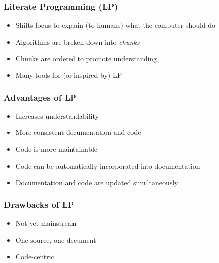 \documentclass{beamer}
\begin{document}

%
%


\begin{frame}
\frametitle{Literate Programming (LP)}

\begin{itemize}
\item Shifts focus to explain (to humans) what the computer should do~\cite{Knuth1984}
\item Algorithms are broken down into \emph{chunks}~\cite{JohnsonAndJohnson1997}
\item Chunks are ordered to promote understanding
\item Many tools for (or inspired by) LP
\end{itemize}

\end{frame}


\begin{frame}
\frametitle{Advantages of LP}

\begin{itemize}
\item Increases understandability
\item More consistent documentation and code~\cite{ShumAndCook1993}
\item Code is more maintainable~\cite{PieterseKourieAndBoake2004}
\item Code can be automatically incorporated into documentation
\item Documentation and code are updated simultaneously
\end{itemize}

\end{frame}


\begin{frame}
\frametitle{Drawbacks of LP}

\begin{itemize}
\item Not yet mainstream %
\item One-source, one document
\item Code-centric
\end{itemize}

\end{frame}
\end{document}
